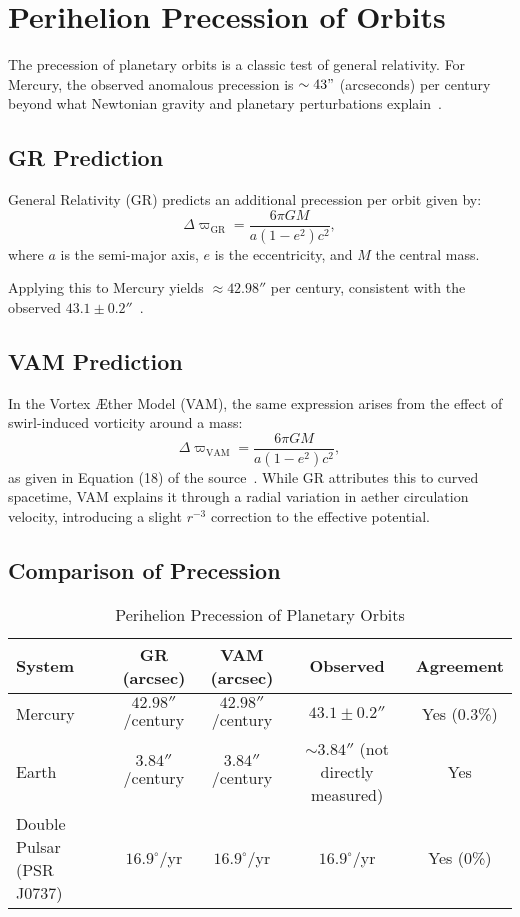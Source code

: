 \section{Perihelion Precession of Orbits}

The precession of planetary orbits is a classic test of general relativity. For Mercury, the observed anomalous precession is $\sim 43"$ (arcseconds) per century beyond what Newtonian gravity and planetary perturbations explain~\cite{will2014confrontation}.

\subsection*{GR Prediction}
General Relativity (GR) predicts an additional precession per orbit given by:
\begin{equation}
    \Delta \varpi_{\text{GR}} = \frac{6\pi GM}{a(1-e^2)c^2},
\end{equation}
where $a$ is the semi-major axis, $e$ is the eccentricity, and $M$ the central mass.

Applying this to Mercury yields $\approx 42.98''$ per century, consistent with the observed $43.1 \pm 0.2''$~\cite{sereno2006solar}.

\subsection*{VAM Prediction}
In the Vortex Æther Model (VAM), the same expression arises from the effect of swirl-induced vorticity around a mass:
\begin{equation}
    \Delta \varpi_{\text{VAM}} = \frac{6\pi GM}{a(1-e^2)c^2},
\end{equation}
as given in Equation (18) of the source~\cite{iskandarani2025VAM2}. While GR attributes this to curved spacetime, VAM explains it through a radial variation in aether circulation velocity, introducing a slight $r^{-3}$ correction to the effective potential.

\subsection*{Comparison of Precession}
\begin{table}[h]
    \centering
    \caption{Perihelion Precession of Planetary Orbits}
    \begin{tabular}{|l|c|c|c|c|}
        \hline
        \textbf{System} & \textbf{GR (arcsec)} & \textbf{VAM (arcsec)} & \textbf{Observed} & \textbf{Agreement} \\
        \hline
        Mercury & $42.98''$/century & $42.98''$/century & $43.1 \pm 0.2''$ & Yes (0.3\%) \\
        Earth & $3.84''$/century & $3.84''$/century & $\sim 3.84''$ (not directly measured) & Yes \\
        Double Pulsar (PSR J0737) & $16.9^\circ$/yr & $16.9^\circ$/yr & $16.9^\circ$/yr & Yes (0\%) \\
        \hline
    \end{tabular}
\end{table}

